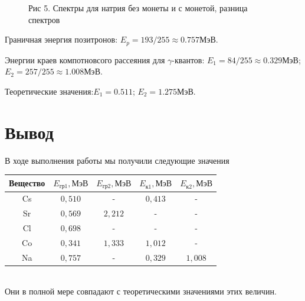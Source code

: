 \documentclass[12pt]{article}
\begin{document}
    \begin{figure}[h!]
      \begin{minipage}[h]{\linewidth}
        Рис 5. Спектры для натрия без монеты и с монетой, разница спектров
      \end{minipage}
      \label{chart:natrium}
    \end{figure}

    Граничная энергия позитронов: $E_p = 193/255 \approx 0.757$МэВ.

    Энергии краев компотновсого рассеяния для $\gamma$-квантов:
    $E_1 = 84/255 \approx 0.329$МэВ; $E_2 = 257/255
    \approx 1.008$МэВ.

    Теоретические значения:$E_1 = 0.511$; $E_2 = 1.275$МэВ.


  \newpage
  \section{Вывод}

    В ходе выполнения работы мы получили следующие значения\\

    \begin{tabular}{ || c || c | c | c | c || }
      \hline
      Вещество & $E_{гр1}, МэВ$ & $E_{гр2}, МэВ$ & $E_{к1}, МэВ$ & $E_{к2},
      МэВ$ \\ \hline\hline
      Cs & $0,510$ & - & $0,413$ & - \\ \hline
      Sr & $0,569$ & $2,212$ & - & - \\ \hline
      Cl & $0,698$ & - & - & - \\ \hline
      Co & $0,341$ & $1,333$ & $1,012$ & - \\ \hline
      Na & $0,757$ & - & $0,329$ & $1,008$ \\
      \hline
    \end{tabular}\\

    Они в полной мере совпадают с теоретическими значениями этих величин.
\end{document}
